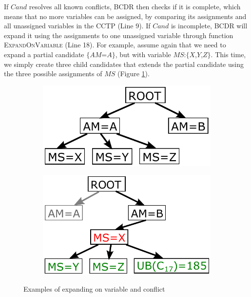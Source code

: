 \documentclass[jair,twoside,11pt,theapa]{article}
\begin{document}
If $\mathit{Cand}$ resolves all known conflicts, BCDR then checks if it is complete,
which means that no more variables can be assigned, by comparing its assignments
and all unassigned variables in the CCTP (Line 9). If $\mathit{Cand}$ is incomplete, BCDR
will expand it using the assignments to one unassigned variable through function
\textsc{ExpandOnVariable} (Line 18). For example, assume again that we need to expand
a partial candidate $\{AM$=$A\}$, but with variable
$MS$:$\{X$,$Y$,$Z\}$. This time, we simply create three child candidates that extends
the partial candidate using the three possible assignments of $MS$ (Figure
\ref{fig:ExpandOnVariable}).



\begin{figure}[h!]
	\centering
	\begin{subfigure}[b]{0.35\textwidth}
		\includegraphics[width=\textwidth]{figures/expand_on_variable.pdf}
		\caption{}
		\label{fig:ExpandOnVariable}
	\end{subfigure}
	\hspace{1cm}
	\begin{subfigure}[b]{0.35\textwidth}
		\includegraphics[width=\textwidth]{figures/expand_on_conflict.pdf}
		\caption{}
		\label{fig:ExpandOnConflict}
	\end{subfigure}
	\caption{Examples of expanding on variable and conflict}
\end{figure} 
\end{document}
